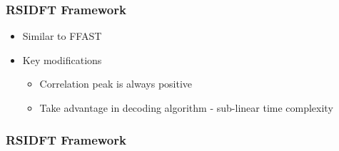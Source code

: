 \begin{frame}\frametitle{RSIDFT Framework}
	
		\begin{figure}[t!]
			\begin{center}
				\resizebox{0.6\textwidth}{!}{}
			\end{center}	   
			\label{fig:rsidft}
			\vspace{5 pt}
		\end{figure}
			\vspace{-0.5cm}
			\begin{block}{}
				{\small
				\begin{itemize}
					\item Similar to FFAST
					\item Key modifications
					\begin{itemize}
						\item Correlation peak is always {\color{blue} positive}
						\item Take advantage in decoding algorithm - {\color{blue}sub-linear} time complexity
					\end{itemize}
				\end{itemize}

}			\end{block}
\end{frame}


\begin{frame}\frametitle{RSIDFT Framework}
	\begin{columns}
\begin{figure}[t!]
	\begin{center}
		\resizebox{1.05\textwidth}{!}{}
		\end{center}	   
		\label{fig:rsidft}
		\vspace{5 pt}
		\end{figure}
		\begin{figure}[h!]
			\begin{center}
				\resizebox{1.0\textwidth}{!}{}	
			\end{center}	   
			\vspace{5 pt}
		\end{figure}
		
	\end{columns}
	
\end{frame}


